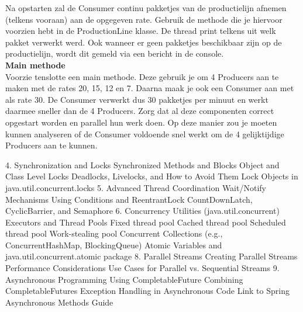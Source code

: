 \begin{oefening}
Na opstarten zal de Consumer continu pakketjes van de productielijn afnemen (telkens vooraan) aan de opgegeven rate. Gebruik de methode die je hiervoor voorzien hebt in de ProductionLine klasse. 
De thread print telkens uit welk pakket verwerkt werd. Ook wanneer er geen pakketjes beschikbaar zijn op de productielijn, wordt dit gemeld via een bericht in de console.
\\
\textbf{Main methode}\\
Voorzie tenslotte een main methode. Deze gebruik je om 4 Producers aan te maken met de rates 20, 15, 12 en 7. Daarna maak je ook een Consumer aan met als rate 30. De Consumer verwerkt dus 30 pakketjes per minuut en werkt daarmee sneller dan de 4 Producers. 
Zorg dat al deze componenten correct opgestart worden en parallel hun werk doen. Op deze manier zou je moeten kunnen analyseren of de Consumer voldoende snel werkt om de 4 gelijktijdige Producers aan te kunnen.
\end{oefening}


4. Synchronization and Locks
Synchronized Methods and Blocks
Object and Class Level Locks
Deadlocks, Livelocks, and How to Avoid Them
Lock Objects in java.util.concurrent.locks
5. Advanced Thread Coordination
Wait/Notify Mechanisms
Using Conditions and ReentrantLock
CountDownLatch, CyclicBarrier, and Semaphore
6. Concurrency Utilities (java.util.concurrent)
Executors and Thread Pools
Fixed thread pool
Cached thread pool
Scheduled thread pool
Work-stealing pool
Concurrent Collections (e.g., ConcurrentHashMap, BlockingQueue)
Atomic Variables and java.util.concurrent.atomic package
8. Parallel Streams
Creating Parallel Streams
Performance Considerations
Use Cases for Parallel vs. Sequential Streams
9. Asynchronous Programming
Using CompletableFuture
Combining CompletableFutures
Exception Handling in Asynchronous Code
Link to Spring Asynchronous Methods Guide
